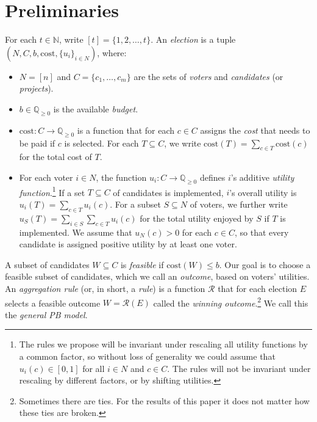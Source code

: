 \documentclass[10pt]{scrartcl}
\renewcommand*{\leq}{\leqslant}
\renewcommand*{\ge}{\geqslant}
\newcommand{\myemph}[1]{{\color{winered}\emph{#1}}}
\newcommand{\naturals}{{{\mathbb{N}}}}
\newcommand{\rationals}{{{\mathbb{Q}}}}
\newcommand{\cost}{{{\mathrm{cost}}}}
\theoremstyle{definition}
\theoremstyle{plain}
\begin{document}
\section{Preliminaries}\label{sec:preliminaries}

For each $t \in \naturals$, write $[t] = \{1,2,\ldots,t\}$.
An \myemph{election} is a tuple $(N, C, b, \cost, \{u_i\}_{i \in N})$, where:
\begin{itemize}
	\item $N=[n]$ and $C = \{c_1, \ldots, c_m\}$ are the sets of \myemph{voters} and  \myemph{candidates} (or \myemph{projects}).
	\item $b \in \rationals_{\ge 0}$ is the available \myemph{budget}.
	\item $\cost\colon C \to \rationals_{\ge 0}$ is a function that for each $c \in C$ assigns the \myemph{cost} that needs to be paid if $c$ is selected. For each $T \subseteq C$, we write $\cost(T) = \sum_{c \in T} \cost(c)$ for the total cost of $T$.
	\item For each voter $i \in N$, the function $u_i\colon C \to \rationals_{\ge 0}$ defines $i$'s additive \myemph{utility function}.\footnote{The rules we propose will be invariant under rescaling all utility functions by a common factor, so without loss of generality we could assume that $u_i(c) \in [0,1]$ for all $i \in N$ and $c \in C$. The rules will not be invariant under rescaling by different factors, or by shifting utilities.}
	If a set $T \subseteq C$ of candidates is implemented, $i$'s overall utility is $u_i(T) =  \sum_{c \in T} u_i(c)$. For a subset $S \subseteq N$ of voters, we further write $u_S(T) = \sum_{i \in S} \sum_{c \in T} u_i(c)$ for the total utility enjoyed by $S$ if $T$ is implemented.
	We assume that $u_N(c) > 0$ for each $c \in C$, so that every candidate is assigned positive utility by at least one voter.
\end{itemize}

A subset of candidates $W \subseteq C$ is \myemph{feasible} if $\cost(W) \leq b$. Our goal is to choose a feasible subset of candidates, which we call an \myemph{outcome}, based on voters' utilities. An \myemph{aggregation rule} (or, in short, a \myemph{rule}) is a function $\mathcal{R}$ that for each election $E$ selects a feasible outcome $W = \mathcal{R}(E)$ called the \myemph{winning outcome}.\footnote{Sometimes there are ties. For the results of this paper it does not matter how these ties are broken.} We call this the \myemph{general PB model}.
\end{document}
